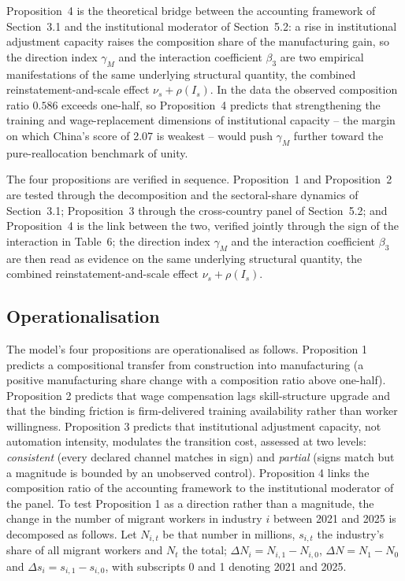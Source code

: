 \documentclass[12pt]{article}
\begin{document}
Proposition~4 is the theoretical bridge between the accounting framework of Section~3.1 and the institutional moderator of Section~5.2: a rise in institutional adjustment capacity raises the composition share of the manufacturing gain, so the direction index $\gamma_M$ and the interaction coefficient $\beta_3$ are two empirical manifestations of the same underlying structural quantity, the combined reinstatement-and-scale effect $\nu_s+\rho(I_s)$. In the data the observed composition ratio $0.586$ exceeds one-half, so Proposition~4 predicts that strengthening the training and wage-replacement dimensions of institutional capacity -- the margin on which China's score of 2.07 is weakest -- would push $\gamma_M$ further toward the pure-reallocation benchmark of unity.

The four propositions are verified in sequence. Proposition~1 and Proposition~2 are tested through the decomposition and the sectoral-share dynamics of Section~3.1; Proposition~3 through the cross-country panel of Section~5.2; and Proposition~4 is the link between the two, verified jointly through the sign of the interaction in Table~6; the direction index $\gamma_M$ and the interaction coefficient $\beta_3$ are then read as evidence on the same underlying structural quantity, the combined reinstatement-and-scale effect $\nu_s+\rho(I_s)$.

\subsection{Operationalisation}

The model's four propositions are operationalised as follows. Proposition 1 predicts a compositional transfer from construction into manufacturing (a positive manufacturing share change with a composition ratio above one-half). Proposition 2 predicts that wage compensation lags skill-structure upgrade and that the binding friction is firm-delivered training availability rather than worker willingness. Proposition 3 predicts that institutional adjustment capacity, not automation intensity, modulates the transition cost, assessed at two levels: \emph{consistent} (every declared channel matches in sign) and \emph{partial} (signs match but a magnitude is bounded by an unobserved control). Proposition 4 links the composition ratio of the accounting framework to the institutional moderator of the panel. To test Proposition 1 as a direction rather than a magnitude, the change in the number of migrant workers in industry $i$ between 2021 and 2025 is decomposed as follows. Let $N_{i,t}$ be that number in millions, $s_{i,t}$ the industry's share of all migrant workers and $N_t$ the total; $\Delta N_{i}=N_{i,1}-N_{i,0}$, $\Delta N=N_{1}-N_{0}$ and $\Delta s_{i}=s_{i,1}-s_{i,0}$, with subscripts 0 and 1 denoting 2021 and 2025.
\end{document}
